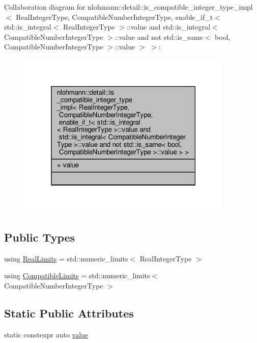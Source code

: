Collaboration diagram for nlohmann\+:\+:detail\+:\+:is\+\_\+compatible\+\_\+integer\+\_\+type\+\_\+impl$<$ Real\+Integer\+Type, Compatible\+Number\+Integer\+Type, enable\+\_\+if\+\_\+t$<$ std\+:\+:is\+\_\+integral$<$ Real\+Integer\+Type $>$\+:\+:value and std\+:\+:is\+\_\+integral$<$ Compatible\+Number\+Integer\+Type $>$\+:\+:value and not std\+:\+:is\+\_\+same$<$ bool, Compatible\+Number\+Integer\+Type $>$\+:\+:value $>$ $>$\+:
\nopagebreak
\begin{figure}[H]
\begin{center}
\leavevmode
\includegraphics[width=292pt]{structnlohmann_1_1detail_1_1is__compatible__integer__type__impl_3_01_real_integer_type_00_01_coma285f188adfd07387075be56b8d64b2d}
\end{center}
\end{figure}
\subsection*{Public Types}
\begin{DoxyCompactItemize}
\item 
using \hyperlink{structnlohmann_1_1detail_1_1is__compatible__integer__type__impl_3_01_real_integer_type_00_01_com5aa74bcf254245a639da00509f4d2655_a0e9f2586c4de25750563770c9388ab9f}{Real\+Limits} = std\+::numeric\+\_\+limits$<$ Real\+Integer\+Type $>$
\item 
using \hyperlink{structnlohmann_1_1detail_1_1is__compatible__integer__type__impl_3_01_real_integer_type_00_01_com5aa74bcf254245a639da00509f4d2655_a002983b5c7c0f72b89d2151a6b39627d}{Compatible\+Limits} = std\+::numeric\+\_\+limits$<$ Compatible\+Number\+Integer\+Type $>$
\end{DoxyCompactItemize}
\subsection*{Static Public Attributes}
\begin{DoxyCompactItemize}
\item 
static constexpr auto \hyperlink{structnlohmann_1_1detail_1_1is__compatible__integer__type__impl_3_01_real_integer_type_00_01_com5aa74bcf254245a639da00509f4d2655_a478242daac7a70e28c749bfec00d1c1b}{value}
\end{DoxyCompactItemize}


